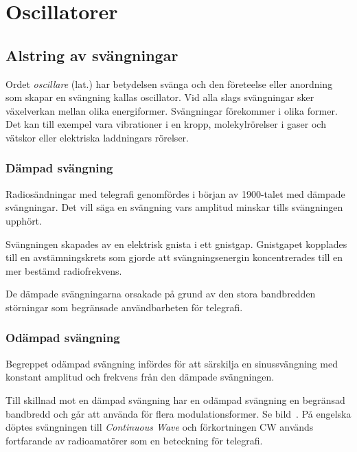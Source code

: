 \newpage
\section{Oscillatorer}
\label{oscillatorer}

\subsection{Alstring av svängningar}
\label{svängningar_alstring}
Ordet \emph{oscillare} (lat.) har betydelsen svänga och den företeelse
eller anordning som skapar en svängning kallas oscillator.
Vid alla slags svängningar sker växelverkan mellan olika energiformer.
Svängningar förekommer i olika former.
Det kan till exempel vara vibrationer i en kropp, molekylrörelser i gaser och
vätskor eller elektriska laddningars rörelser.


\subsubsection{Dämpad svängning}
Radiosändningar med telegrafi genomfördes i början av 1900-talet med dämpade
svängningar.
Det vill säga en svängning vars amplitud minskar tills svängningen upphört.

Svängningen skapades av en elektrisk gnista i ett gnistgap.
Gnistgapet kopplades till en avstämningskrets som gjorde att svängningsenergin
koncentrerades till en mer bestämd radiofrekvens.

De dämpade svängningarna orsakade på grund av den stora bandbredden störningar
som begränsade användbarheten för telegrafi.

\subsubsection{Odämpad svängning}
Begreppet odämpad svängning infördes för att särskilja en sinussvängning med 
konstant amplitud och frekvens från den dämpade svängningen.

Till skillnad mot en dämpad svängning har en odämpad svängning en begränsad
bandbredd och går att använda för flera modulationsformer. Se bild~.
På engelska döptes svängningen till \emph{Continuous Wave} och förkortningen CW
används fortfarande av radioamatörer som en beteckning för telegrafi.

